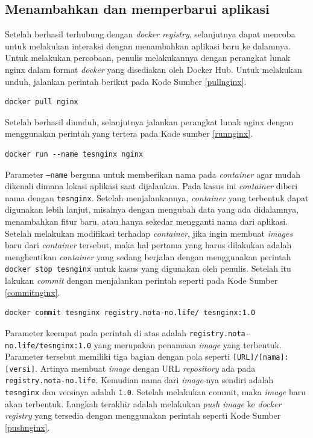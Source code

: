        \subsection{Menambahkan dan memperbarui aplikasi}
        	Setelah berhasil terhubung dengan \textit{docker registry}, selanjutnya dapat mencoba untuk melakukan interaksi dengan menambahkan aplikasi baru ke dalamnya. Untuk melakukan percobaan, penulis melakukannya dengan perangkat lunak nginx dalam format \textit{docker} yang disediakan oleh Docker Hub. Untuk melakukan unduh, jalankan perintah berikut pada Kode Sumber \ref{pullnginx}. \\
\begin{lstlisting}[frame=single,tabsize=2,breaklines,caption={Perintah \textit{Pull} Nginx},label=pullnginx, captionpos=b]
docker pull nginx
\end{lstlisting}
            \indent Setelah berhasil diunduh, selanjutnya jalankan perangkat lunak nginx dengan menggunakan perintah yang tertera pada Kode sumber \ref{runnginx}. \\
\begin{lstlisting}[frame=single,tabsize=2,breaklines,caption={Perintah Menjalankan \textit{Image} Nginx},label=runnginx, captionpos=b]
docker run --name tesnginx nginx
\end{lstlisting}
            \indent Parameter \texttt{--name} berguna untuk memberikan nama pada \textit{container} agar mudah dikenali dimana lokasi aplikasi saat dijalankan. Pada kasus ini \textit{container} diberi nama dengan \texttt{tesnginx}. Setelah menjalankannya, \textit{container} yang terbentuk dapat digunakan lebih lanjut, misalnya dengan mengubah data yang ada didalamnya, menambahkan fitur baru, atau hanya sekedar mengganti nama dari aplikasi. Setelah melakukan modifikasi terhadap \textit{container}, jika ingin membuat \textit{images} baru dari \textit{container} tersebut, maka hal pertama yang harus dilakukan adalah menghentikan \textit{container} yang sedang berjalan dengan menggunakan perintah \texttt{docker stop tesnginx} untuk kasus yang digunakan oleh penulis. Setelah itu lakukan \textit{commit} dengan menjalankan perintah seperti pada Kode Sumber \ref{commitnginx}.
\begin{lstlisting}[frame=single,tabsize=2,breaklines,caption={Perintah \textit{Commit Container} Nginx},label=commitnginx, captionpos=b]
docker commit tesnginx registry.nota-no.life/ tesnginx:1.0
\end{lstlisting}
            \indent Parameter keempat pada perintah di atas adalah \texttt{registry.nota-no.life/tesnginx:1.0} yang merupakan penamaan \textit{image} yang terbentuk. Parameter tersebut memiliki tiga bagian dengan pola seperti \texttt{[URL]/[nama]:[versi]}. Artinya membuat \textit{image} dengan URL \textit{repository} ada pada \texttt{registry.nota-no.life}. Kemudian nama dari \textit{image}-nya sendiri adalah \texttt{tesnginx} dan versinya adalah \texttt{1.0}. Setelah melakukan commit, maka \textit{image} baru akan terbentuk. Langkah terakhir adalah melakukan \textit{push image} ke \textit{docker registry} yang tersedia dengan menggunakan perintah seperti Kode Sumber \ref{pushnginx}. \\
